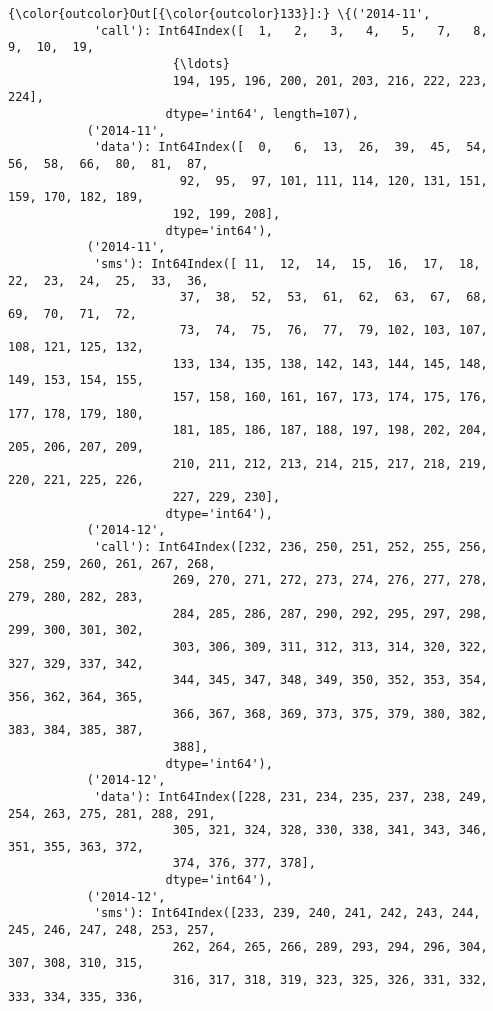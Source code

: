 \documentclass[11pt]{article}
\begin{document}
\begin{Verbatim}[commandchars=\\\{\}]
{\color{outcolor}Out[{\color{outcolor}133}]:} \{('2014-11',
            'call'): Int64Index([  1,   2,   3,   4,   5,   7,   8,   9,  10,  19,
                       {\ldots}
                       194, 195, 196, 200, 201, 203, 216, 222, 223, 224],
                      dtype='int64', length=107),
           ('2014-11',
            'data'): Int64Index([  0,   6,  13,  26,  39,  45,  54,  56,  58,  66,  80,  81,  87,
                        92,  95,  97, 101, 111, 114, 120, 131, 151, 159, 170, 182, 189,
                       192, 199, 208],
                      dtype='int64'),
           ('2014-11',
            'sms'): Int64Index([ 11,  12,  14,  15,  16,  17,  18,  22,  23,  24,  25,  33,  36,
                        37,  38,  52,  53,  61,  62,  63,  67,  68,  69,  70,  71,  72,
                        73,  74,  75,  76,  77,  79, 102, 103, 107, 108, 121, 125, 132,
                       133, 134, 135, 138, 142, 143, 144, 145, 148, 149, 153, 154, 155,
                       157, 158, 160, 161, 167, 173, 174, 175, 176, 177, 178, 179, 180,
                       181, 185, 186, 187, 188, 197, 198, 202, 204, 205, 206, 207, 209,
                       210, 211, 212, 213, 214, 215, 217, 218, 219, 220, 221, 225, 226,
                       227, 229, 230],
                      dtype='int64'),
           ('2014-12',
            'call'): Int64Index([232, 236, 250, 251, 252, 255, 256, 258, 259, 260, 261, 267, 268,
                       269, 270, 271, 272, 273, 274, 276, 277, 278, 279, 280, 282, 283,
                       284, 285, 286, 287, 290, 292, 295, 297, 298, 299, 300, 301, 302,
                       303, 306, 309, 311, 312, 313, 314, 320, 322, 327, 329, 337, 342,
                       344, 345, 347, 348, 349, 350, 352, 353, 354, 356, 362, 364, 365,
                       366, 367, 368, 369, 373, 375, 379, 380, 382, 383, 384, 385, 387,
                       388],
                      dtype='int64'),
           ('2014-12',
            'data'): Int64Index([228, 231, 234, 235, 237, 238, 249, 254, 263, 275, 281, 288, 291,
                       305, 321, 324, 328, 330, 338, 341, 343, 346, 351, 355, 363, 372,
                       374, 376, 377, 378],
                      dtype='int64'),
           ('2014-12',
            'sms'): Int64Index([233, 239, 240, 241, 242, 243, 244, 245, 246, 247, 248, 253, 257,
                       262, 264, 265, 266, 289, 293, 294, 296, 304, 307, 308, 310, 315,
                       316, 317, 318, 319, 323, 325, 326, 331, 332, 333, 334, 335, 336,

\end{Verbatim}
\end{document}
